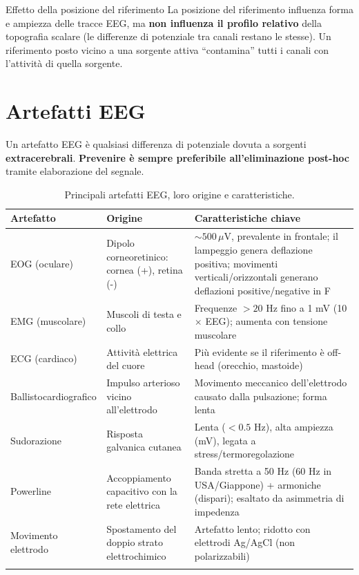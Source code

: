 \begin{approfondimento}{Effetto della posizione del riferimento}
La posizione del riferimento influenza forma e ampiezza delle tracce EEG, ma \textbf{non influenza il profilo relativo} della topografia scalare (le differenze di potenziale tra canali restano le stesse). Un riferimento posto vicino a una sorgente attiva ``contamina'' tutti i canali con l'attività di quella sorgente.
\end{approfondimento}

\section{Artefatti EEG}

\begin{definizione}
Un artefatto EEG è qualsiasi differenza di potenziale dovuta a sorgenti \textbf{extracerebrali}. \textbf{Prevenire è sempre preferibile all'eliminazione post-hoc} tramite elaborazione del segnale.
\end{definizione}

\begin{longtable}{p{2.8cm}p{4.5cm}p{6cm}}
\toprule
\textbf{Artefatto} & \textbf{Origine} & \textbf{Caratteristiche chiave} \\
\midrule
\endhead
EOG (oculare) & Dipolo corneoretinico: cornea (+), retina (-) & $\sim 500\,\mu$V, prevalente in frontale; il lampeggio genera deflazione positiva; movimenti verticali/orizzontali generano deflazioni positive/negative in F \\[4pt]
EMG (muscolare) & Muscoli di testa e collo & Frequenze $> 20$ Hz fino a 1 mV (10$\times$ EEG); aumenta con tensione muscolare \\[4pt]
ECG (cardiaco) & Attività elettrica del cuore & Più evidente se il riferimento è off-head (orecchio, mastoide) \\[4pt]
Ballistocardiografico & Impulso arterioso vicino all'elettrodo & Movimento meccanico dell'elettrodo causato dalla pulsazione; forma lenta \\[4pt]
Sudorazione & Risposta galvanica cutanea & Lenta ($< 0.5$ Hz), alta ampiezza (mV), legata a stress/termoregolazione \\[4pt]
Powerline & Accoppiamento capacitivo con la rete elettrica & Banda stretta a 50 Hz (60 Hz in USA/Giappone) + armoniche (dispari); esaltato da asimmetria di impedenza \\[4pt]
Movimento elettrodo & Spostamento del doppio strato elettrochimico & Artefatto lento; ridotto con elettrodi Ag/AgCl (non polarizzabili) \\
\bottomrule
\caption{Principali artefatti EEG, loro origine e caratteristiche.}
\end{longtable}

